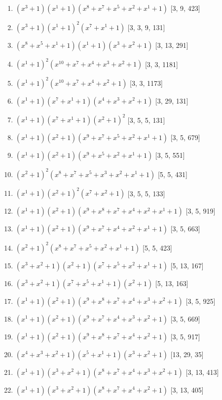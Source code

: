 \documentclass[10pt,twocolumn]{article}
\begin{document}
\begin{enumerate}
\item $(x^{3} + 1)(x^{1} + 1)(x^{8} + x^{7} + x^{5} + x^{2} + x^{1} + 1)$  [3, 9, 423]
\item $(x^{3} + 1)(x^{1} + 1)^{2}(x^{7} + x^{1} + 1)$  [3, 3, 9, 131]
\item $(x^{8} + x^{5} + x^{1} + 1)(x^{1} + 1)(x^{3} + x^{2} + 1)$  [3, 13, 291]
\item $(x^{1} + 1)^{2}(x^{10} + x^{7} + x^{4} + x^{3} + x^{2} + 1)$  [3, 3, 1181]
\item $(x^{1} + 1)^{2}(x^{10} + x^{7} + x^{4} + x^{2} + 1)$  [3, 3, 1173]
\item $(x^{1} + 1)(x^{7} + x^{1} + 1)(x^{4} + x^{3} + x^{2} + 1)$  [3, 29, 131]
\item $(x^{1} + 1)(x^{7} + x^{1} + 1)(x^{2} + 1)^{2}$  [3, 5, 5, 131]
\item $(x^{1} + 1)(x^{2} + 1)(x^{9} + x^{7} + x^{5} + x^{2} + x^{1} + 1)$  [3, 5, 679]
\item $(x^{1} + 1)(x^{2} + 1)(x^{9} + x^{5} + x^{2} + x^{1} + 1)$  [3, 5, 551]
\item $(x^{2} + 1)^{2}(x^{8} + x^{7} + x^{5} + x^{3} + x^{2} + x^{1} + 1)$  [5, 5, 431]
\item $(x^{1} + 1)(x^{2} + 1)^{2}(x^{7} + x^{2} + 1)$  [3, 5, 5, 133]
\item $(x^{1} + 1)(x^{2} + 1)(x^{9} + x^{8} + x^{7} + x^{4} + x^{2} + x^{1} + 1)$  [3, 5, 919]
\item $(x^{1} + 1)(x^{2} + 1)(x^{9} + x^{7} + x^{4} + x^{2} + x^{1} + 1)$  [3, 5, 663]
\item $(x^{2} + 1)^{2}(x^{8} + x^{7} + x^{5} + x^{2} + x^{1} + 1)$  [5, 5, 423]
\item $(x^{3} + x^{2} + 1)(x^{2} + 1)(x^{7} + x^{5} + x^{2} + x^{1} + 1)$  [5, 13, 167]
\item $(x^{3} + x^{2} + 1)(x^{7} + x^{5} + x^{1} + 1)(x^{2} + 1)$  [5, 13, 163]
\item $(x^{1} + 1)(x^{2} + 1)(x^{9} + x^{8} + x^{7} + x^{4} + x^{3} + x^{2} + 1)$  [3, 5, 925]
\item $(x^{1} + 1)(x^{2} + 1)(x^{9} + x^{7} + x^{4} + x^{3} + x^{2} + 1)$  [3, 5, 669]
\item $(x^{1} + 1)(x^{2} + 1)(x^{9} + x^{8} + x^{7} + x^{4} + x^{2} + 1)$  [3, 5, 917]
\item $(x^{4} + x^{3} + x^{2} + 1)(x^{5} + x^{1} + 1)(x^{3} + x^{2} + 1)$  [13, 29, 35]
\item $(x^{1} + 1)(x^{3} + x^{2} + 1)(x^{8} + x^{7} + x^{4} + x^{3} + x^{2} + 1)$  [3, 13, 413]
\item $(x^{1} + 1)(x^{3} + x^{2} + 1)(x^{8} + x^{7} + x^{4} + x^{2} + 1)$  [3, 13, 405]

\end{enumerate}
\end{document}
